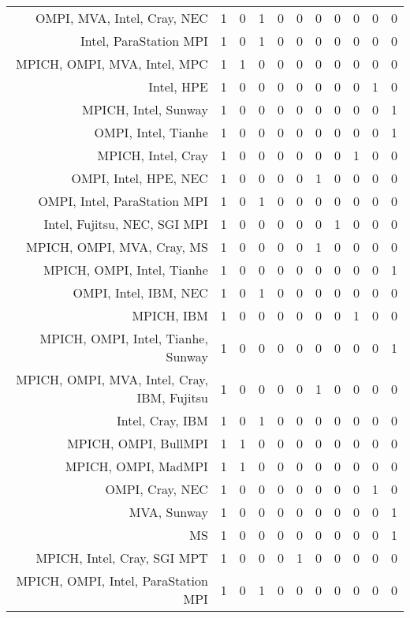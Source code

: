{\begin{landscape}
\begin{longtable}[htb]{r|c|c|c|c|c|c|c|c|c|c}
{OMPI, MVA, Intel, Cray, NEC} & 1 & 0 & 1 & 0 & 0 & 0 & 0 & 0 & 0 & 0 \\%
{Intel, ParaStation MPI} & 1 & 0 & 1 & 0 & 0 & 0 & 0 & 0 & 0 & 0 \\%
{MPICH, OMPI, MVA, Intel, MPC} & 1 & 1 & 0 & 0 & 0 & 0 & 0 & 0 & 0 & 0 \\%
{Intel, HPE} & 1 & 0 & 0 & 0 & 0 & 0 & 0 & 0 & 1 & 0 \\%
{MPICH, Intel, Sunway} & 1 & 0 & 0 & 0 & 0 & 0 & 0 & 0 & 0 & 1 \\%
{OMPI, Intel, Tianhe} & 1 & 0 & 0 & 0 & 0 & 0 & 0 & 0 & 0 & 1 \\%
{MPICH, Intel, Cray} & 1 & 0 & 0 & 0 & 0 & 0 & 0 & 1 & 0 & 0 \\%
{OMPI, Intel, HPE, NEC} & 1 & 0 & 0 & 0 & 0 & 1 & 0 & 0 & 0 & 0 \\%
{OMPI, Intel, ParaStation MPI} & 1 & 0 & 1 & 0 & 0 & 0 & 0 & 0 & 0 & 0 \\%
{Intel, Fujitsu, NEC, SGI MPI} & 1 & 0 & 0 & 0 & 0 & 0 & 1 & 0 & 0 & 0 \\%
{MPICH, OMPI, MVA, Cray, MS} & 1 & 0 & 0 & 0 & 0 & 1 & 0 & 0 & 0 & 0 \\%
{MPICH, OMPI, Intel, Tianhe} & 1 & 0 & 0 & 0 & 0 & 0 & 0 & 0 & 0 & 1 \\%
{OMPI, Intel, IBM, NEC} & 1 & 0 & 1 & 0 & 0 & 0 & 0 & 0 & 0 & 0 \\%
{MPICH, IBM} & 1 & 0 & 0 & 0 & 0 & 0 & 0 & 1 & 0 & 0 \\%
{MPICH, OMPI, Intel, Tianhe, Sunway} & 1 & 0 & 0 & 0 & 0 & 0 & 0 & 0 & 0 & 1 \\%
{MPICH, OMPI, MVA, Intel, Cray, IBM, Fujitsu} & 1 & 0 & 0 & 0 & 0 & 1 & 0 & 0 & 0 & 0 \\%
{Intel, Cray, IBM} & 1 & 0 & 1 & 0 & 0 & 0 & 0 & 0 & 0 & 0 \\%
{MPICH, OMPI, BullMPI} & 1 & 1 & 0 & 0 & 0 & 0 & 0 & 0 & 0 & 0 \\%
{MPICH, OMPI, MadMPI} & 1 & 1 & 0 & 0 & 0 & 0 & 0 & 0 & 0 & 0 \\%
{OMPI, Cray, NEC} & 1 & 0 & 0 & 0 & 0 & 0 & 0 & 0 & 1 & 0 \\%
{MVA, Sunway} & 1 & 0 & 0 & 0 & 0 & 0 & 0 & 0 & 0 & 1 \\%
{MS} & 1 & 0 & 0 & 0 & 0 & 0 & 0 & 0 & 0 & 1 \\%
{MPICH, Intel, Cray, SGI MPT} & 1 & 0 & 0 & 0 & 1 & 0 & 0 & 0 & 0 & 0 \\%
{MPICH, OMPI, Intel, ParaStation MPI} & 1 & 0 & 1 & 0 & 0 & 0 & 0 & 0 & 0 & 0 \\%

\end{longtable}
\end{landscape}}
